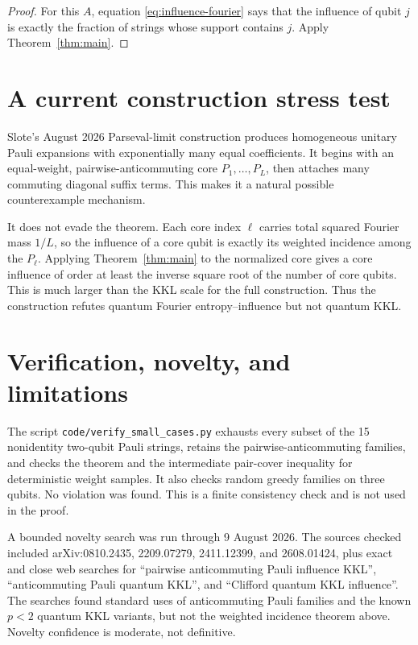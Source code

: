 \documentclass[11pt]{article}
\begin{document}
\begin{proof}
For this $A$, equation \eqref{eq:influence-fourier} says that the influence
of qubit $j$ is exactly the fraction of strings whose support contains $j$.
Apply Theorem~\ref{thm:main}.
\end{proof}

\section{A current construction stress test}

Slote's August 2026 Parseval-limit construction \cite{Slote} produces
homogeneous unitary Pauli expansions with exponentially many equal
coefficients. It begins with an equal-weight, pairwise-anticommuting core
$P_1,\dots,P_L$, then attaches many commuting diagonal suffix terms. This
makes it a natural possible counterexample mechanism.

It does not evade the theorem. Each core index $\ell$ carries total squared
Fourier mass $1/L$, so the influence of a core qubit is exactly its weighted
incidence among the $P_\ell$. Applying Theorem~\ref{thm:main} to the
normalized core gives a core influence of order at least the inverse square
root of the number of core qubits. This is much larger than the KKL scale for
the full construction. Thus the construction refutes quantum Fourier
entropy--influence but not quantum KKL.

\section{Verification, novelty, and limitations}

The script \texttt{code/verify\_small\_cases.py} exhausts every subset of the
15 nonidentity two-qubit Pauli strings, retains the pairwise-anticommuting
families, and checks the theorem and the intermediate pair-cover inequality
for deterministic weight samples. It also checks random greedy families on
three qubits. No violation was found. This is a finite consistency check and
is not used in the proof.

A bounded novelty search was run through 9 August 2026. The sources checked
included arXiv:0810.2435, 2209.07279, 2411.12399, and 2608.01424, plus exact
and close web searches for ``pairwise anticommuting Pauli influence KKL'',
``anticommuting Pauli quantum KKL'', and ``Clifford quantum KKL influence''.
The searches found standard uses of anticommuting Pauli families and the
known $p<2$ quantum KKL variants, but not the weighted incidence theorem
above. Novelty confidence is moderate, not definitive.
\end{document}

